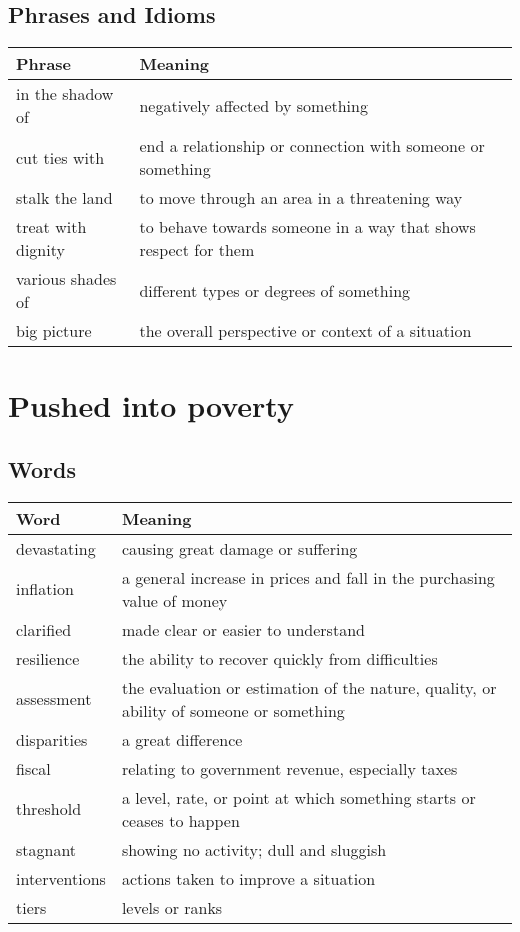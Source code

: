 \documentclass{article}%
\begin{document}
%
\subsection{Phrases and Idioms}%
\label{subsec:PhrasesandIdioms}%
\begin{tabular}{ll}%
Phrase&Meaning\\%
\hline%
in the shadow of&negatively affected by something\\%
cut ties with&end a relationship or connection with someone or something\\%
stalk the land&to move through an area in a threatening way\\%
treat with dignity&to behave towards someone in a way that shows respect for them\\%
various shades of&different types or degrees of something\\%
big picture&the overall perspective or context of a situation\\%
\end{tabular}

%
\section{Pushed into poverty}%
\label{sec:Pushedintopoverty}%
\subsection{Words}%
\label{subsec:Words}%
\begin{tabular}{ll}%
Word&Meaning\\%
\hline%
devastating&causing great damage or suffering\\%
inflation&a general increase in prices and fall in the purchasing value of money\\%
clarified&made clear or easier to understand\\%
resilience&the ability to recover quickly from difficulties\\%
assessment&the evaluation or estimation of the nature, quality, or ability of someone or something\\%
disparities&a great difference\\%
fiscal&relating to government revenue, especially taxes\\%
threshold&a level, rate, or point at which something starts or ceases to happen\\%
stagnant&showing no activity; dull and sluggish\\%
interventions&actions taken to improve a situation\\%
tiers&levels or ranks\\%
\end{tabular}
\end{document}
